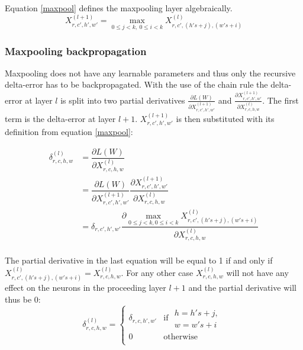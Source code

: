 \documentclass[a4paper,11pt,twoside]{article}
\newcommand*{\pd}[2]{\ensuremath{\dfrac{\partial #1}{\partial #2}}}
\newcommand*{\inpd}[2]{\ensuremath{\frac{\partial #1}{\partial #2}}}
\begin{document}
Equation \eqref{maxpool} defines the maxpooling layer algebraically. \cite{cs231n} \cite{convmath}
\begin{equation}\label{maxpool}
X^{(l+1)}_{r,c',h',w'} = \underset{0 \leq j < k, \ 0 \leq i < k}{\max} X^{(l)}_{r,c',(h's+j),(w's+i)}
\end{equation}

\subsubsection{Maxpooling backpropagation}
Maxpooling does not have any learnable parameters and thus only the recursive delta-error has to be backpropagated. With the use of the chain rule the delta-error at layer $l$ is split into two partial derivatives $\inpd{L(W)}{X^{(l+1)}_{r,c',h',w'}}$ and $\inpd{X^{(l+1)}_{r,c',h',w'}}{X^{(l)}_{r,c,h,w}}$. The first term is the delta-error at layer $l+1$. $X^{(l+1)}_{r,c',h',w'}$ is then substituted with its definition from equation \eqref{maxpool}: \cite{cs231n} \cite{convmath} \cite{webconv3}

\begin{equation}
\begin{split}
	\delta^{(l)}_{r,c,h,w}
		& = \pd{L(W)}{X^{(l)}_{r,c,h,w}} \\
		& = \pd{L(W)}{X^{(l+1)}_{r,c',h',w'}} \pd{X^{(l+1)}_{r,c',h',w'}}{X^{(l)}_{r,c,h,w}} \\
		& = \delta_{r,c',h',w'} \pd{\underset{0 \leq j < k,0 \leq i < k}{\max} X^{(l)}_{r,c',(h's+j),(w's+i)}}{X^{(l)}_{r,c,h,w}} \\
\end{split}
\end{equation}

The partial derivative in the last equation will be equal to 1 if and only if $X^{(l)}_{r,c',(h's+j),(w's+i)} = X^{(l)}_{r,c,h,w}$. For any other case $X^{(l)}_{r,c,h,w}$ will not have any effect on the neurons in the proceeding layer $l+1$ and the partial derivative will thus be 0:\cite{cs231n} \cite{convmath} \cite{webconv3}
\begin{equation}
\delta^{(l)}_{r,c,h,w} = \begin{cases}
				\delta_{r,c,h',w'} & \mbox{if } \begin{split} h = h's+j, \\w = w's+i \end{split}\\
				0 & \mbox{otherwise}\\
			\end{cases}
\end{equation}
\end{document}
